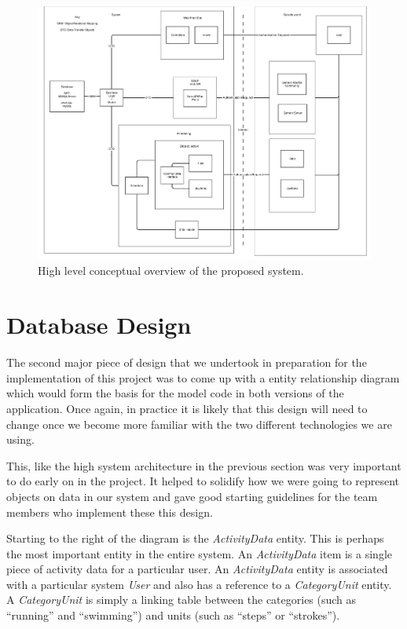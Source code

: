 \begin{figure}[H]
\centering
\includegraphics[width=1.0\textwidth]{../design/system/groupproject_systemarchitecture.png}
\caption{High level conceptual overview of the proposed system.}
\label{fig:system-architecture}
\end{figure}

\section{Database Design}
The second major piece of design that we undertook in preparation for the implementation of this project was to come up with a entity relationship diagram which would form the basis for the model code in both versions of the application. Once again, in practice it is likely that this design will need to change once we become more familiar with the two different technologies we are using.

This, like the high system architecture in the previous section was very important to do early on in the project. It helped to solidify how we were going to represent objects on data in our system and gave good starting guidelines for the team members who implement these this design.

Starting to the right of the diagram is the \textit{ActivityData} entity. This is perhaps the most important entity in the entire system. An \textit{ActivityData} item is a single piece of activity data for a particular user. An \textit{ActivityData} entity is associated with a particular system \textit{User} and also has a reference to a \textit{CategoryUnit} entity. A \textit{CategoryUnit} is simply a linking table between the categories (such as ``running'' and ``swimming'') and units (such as ``steps'' or ``strokes'').

